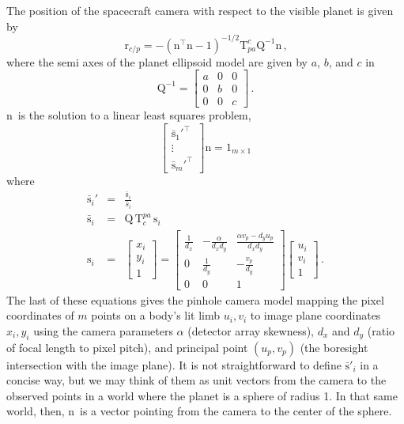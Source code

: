 \documentclass[12pt]{article}
\newcommand{\Tf}[2]{\ensuremath{\mathrm{T}_{#1}^{#2}}}
\newcommand{\vecr}{\ensuremath{\mathrm{r}}}
\newcommand{\vecn}{\ensuremath{\mathrm{n}}}
\begin{document}
The position of the spacecraft camera with respect to the visible planet is given by
\begin{equation}
\vecr_{c/p} = -(\vecn^\top \vecn - 1)^{-1/2} \Tf{pa}{c} \mathrm{Q}^{-1} \vecn\,\text{,}\label{eq:horizon_model}
\end{equation}
where the semi axes of the planet ellipsoid model are given by $a$, $b$, and $c$ in 
\begin{equation}
\mathrm{Q}^{-1} = \begin{bmatrix} a & 0 & 0 \\ 0 & b & 0 \\ 0 & 0 & c\end{bmatrix}\,\text{.}
\end{equation}
\vecn\ is the solution to a linear least squares problem,
\begin{equation}
\begin{bmatrix} %
\bar{\mathrm{s}}_1'^\top \\ %
\vdots \\
\bar{\mathrm{s}}_m'^\top %
\end{bmatrix}\mathrm{n} = 1_{m\times 1}
\end{equation}
where
\begin{eqnarray}
\bar{\mathrm{s}}_i' &=& \frac{\bar{\mathrm{s}}_i}{\bar{s}_i} \\
\bar{\mathrm{s}}_i &=& \mathrm{Q}\, \Tf{c}{pa}\, \mathrm{s}_i \\
\mathrm{s}_i &=& \begin{bmatrix}x_i \\ y_i \\ 1\end{bmatrix} = \begin{bmatrix}%
\frac{1}{d_x} & -\frac{\alpha}{d_x d_y} & \frac{\alpha v_p - d_y u_p}{d_x d_y} \\
0 & \frac{1}{d_y} & -\frac{v_p}{d_y} \\
0 & 0 & 1\end{bmatrix}\begin{bmatrix}u_i \\ v_i \\ 1\end{bmatrix}\,\text{.}
\end{eqnarray}
The last of these equations gives the pinhole camera model mapping the pixel coordinates of $m$ points on a body's lit limb $u_i, v_i$ to image plane coordinates $x_i, y_i$ using the camera parameters $\alpha$ (detector array skewness), $d_x$ and $d_y$ (ratio of focal length to pixel pitch), and principal point $(u_p, v_p)$ (the boresight intersection with the image plane). It is not straightforward to define $\bar{\mathrm{s}}'_i$ in a concise way, but we may think of them as unit vectors from the camera to the observed points in a world where the planet is a sphere of radius 1. In that same world, then, \vecn\ is a vector pointing from the camera to the center of the sphere. \citep{Christian2016}
\end{document}
